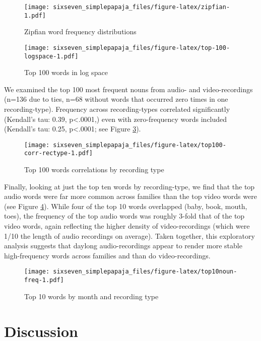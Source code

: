 \documentclass[floatsintext,man]{apa6}
\theoremstyle{definition}
\theoremstyle{definition}
\theoremstyle{definition}
\theoremstyle{remark}
\begin{document}
\begin{figure}
\centering
\texttt{[image: sixseven\_simplepapaja\_files/figure-latex/zipfian-1.pdf]}
\caption{\label{fig:zipfian}Zipfian word frequency distributions}
\end{figure}

\begin{figure}
\centering
\texttt{[image: sixseven\_simplepapaja\_files/figure-latex/top-100-logspace-1.pdf]}
\caption{\label{fig:top-100-logspace}Top 100 words in log space}
\end{figure}

We examined the top 100 most frequent nouns from audio- and
video-recordings (n=136 due to ties, n=68 without words that occurred
zero times in one recording-type). Frequency across recording-types
correlated significantly (Kendall's tau: 0.39, p\textless{}.0001,) even
with zero-frequency words included (Kendall's tau: 0.25,
p\textless{}.0001; see Figure \ref{fig:top100-corr-rectype}).

\begin{figure}
\centering
\texttt{[image: sixseven\_simplepapaja\_files/figure-latex/top100-corr-rectype-1.pdf]}
\caption{\label{fig:top100-corr-rectype}Top 100 words correlations by
recording type}
\end{figure}

Finally, looking at just the top ten words by recording-type, we find
that the top audio words were far more common across families than the
top video words were (see Figure \ref{fig:top10noun-freq}). While four
of the top 10 words overlapped (baby, book, mouth, toes), the frequency
of the top audio words was roughly 3-fold that of the top video words,
again reflecting the higher density of video-recordings (which were 1/10
the length of audio recordings on average). Taken together, this
exploratory analysis suggests that daylong audio-recordings appear to
render more stable high-frequency words across families and than do
video-recordings.

\begin{figure}
\centering
\texttt{[image: sixseven\_simplepapaja\_files/figure-latex/top10noun-freq-1.pdf]}
\caption{\label{fig:top10noun-freq}Top 10 words by month and recording type}
\end{figure}

\section{Discussion}\label{discussion}
\end{document}

